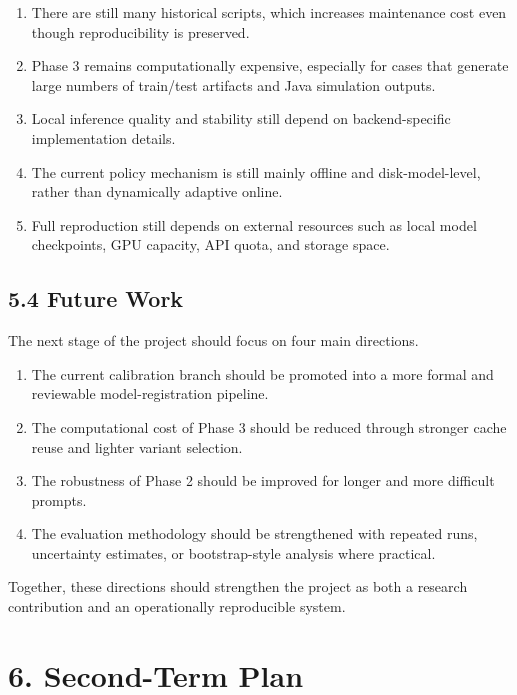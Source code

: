 \documentclass[
  11pt,
  a4paper]{article}
\providecommand{\tightlist}{%
  \setlength{\itemsep}{0pt}\setlength{\parskip}{0pt}}
\begin{document}
\begin{enumerate}
\def\labelenumi{\arabic{enumi}.}
\tightlist
\item
  There are still many historical scripts, which increases maintenance
  cost even though reproducibility is preserved.
\item
  Phase 3 remains computationally expensive, especially for cases that
  generate large numbers of train/test artifacts and Java simulation
  outputs.
\item
  Local inference quality and stability still depend on backend-specific
  implementation details.
\item
  The current policy mechanism is still mainly offline and
  disk-model-level, rather than dynamically adaptive online.
\item
  Full reproduction still depends on external resources such as local
  model checkpoints, GPU capacity, API quota, and storage space.
\end{enumerate}

\hypertarget{future-work}{%
\subsection{5.4 Future Work}\label{future-work}}

The next stage of the project should focus on four main directions.

\begin{enumerate}
\def\labelenumi{\arabic{enumi}.}
\tightlist
\item
  The current calibration branch should be promoted into a more formal
  and reviewable model-registration pipeline.
\item
  The computational cost of Phase 3 should be reduced through stronger
  cache reuse and lighter variant selection.
\item
  The robustness of Phase 2 should be improved for longer and more
  difficult prompts.
\item
  The evaluation methodology should be strengthened with repeated runs,
  uncertainty estimates, or bootstrap-style analysis where practical.
\end{enumerate}

Together, these directions should strengthen the project as both a
research contribution and an operationally reproducible system.

\hypertarget{second-term-plan}{%
\section{6. Second-Term Plan}\label{second-term-plan}}
\end{document}
